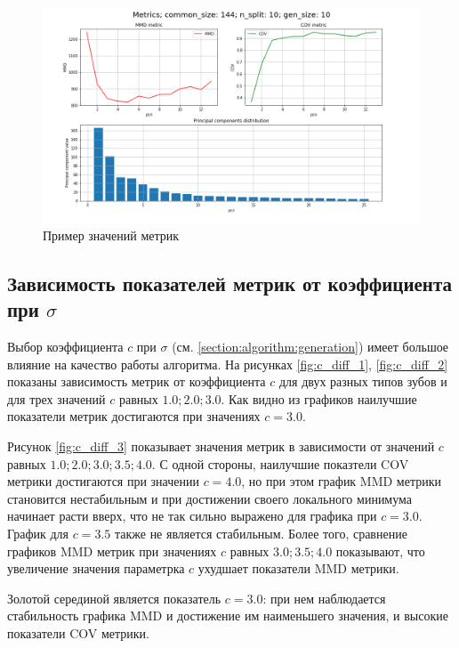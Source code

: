 \begin{figure}[h]
\includegraphics[width=1\linewidth]{images/res_example.png}
\caption{Пример значений метрик}
\label{fig:res_example}
\end{figure}

\subsection{Зависимость показателей метрик от коэффициента при $\sigma$}

Выбор коэффициента $c$ при $\sigma$ (см. \ref{section:algorithm:generation}) имеет большое влияние на качество работы алгоритма. На рисунках \ref{fig:c_diff_1}, \ref{fig:c_diff_2} показаны зависимость метрик от коэффициента $c$ для двух разных типов зубов и для трех значений $c$ равных $1.0; 2.0; 3.0$. Как видно из графиков наилучшие показатели метрик  достигаются при значениях $c = 3.0$. \par

Рисунок \ref{fig:c_diff_3} показывает значения метрик в зависимости от значений $c$ равных $1.0; 2.0; 3.0; 3.5; 4.0$. С одной стороны, наилучшие показтели COV метрики достигаются при значении $c = 4.0$, но при этом график MMD метрики становится нестабильным и при достижении своего локального минимума начинает расти вверх, что не так сильно выражено для графика при $c = 3.0$. График для $c = 3.5$ также не является стабильным. Более того, сравнение графиков MMD метрик при значениях $c$ равных $3.0; 3.5; 4.0$ показывают, что увеличение значения параметрка $c$ ухудшает показатели MMD метрики. \par
Золотой серединой является показатель $c = 3.0$: при нем наблюдается стабильность графика MMD и достижение им наименьшего значения, и высокие показатели COV метрики.


